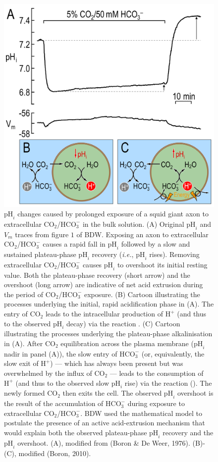 \documentclass[fleqn,10pt]{physiome}
\begin{document}
\begin{figure}
\centering
\includegraphics[scale=0.25]{Figure 1.png}
\caption{\label{fig:1} $\mathrm{pH}_i$ changes caused by prolonged exposure of a squid giant axon to extracellular $\mathrm{CO_2}$/$\mathrm{HCO_3^-}$ in the bulk solution. (A) Original $\mathrm{pH}_i$ and $V_m$ traces from figure $1$ of BDW. Exposing an axon to extracellular $\mathrm{CO_2}$/$\mathrm{HCO_3^-}$ causes a rapid fall in $\mathrm{pH}_i$ followed by a slow and sustained plateau-phase $\mathrm{pH}_i$ recovery (\emph{i.e.}, $\mathrm{pH}_i$ rises). Removing extracellular $\mathrm{CO_2}$/$\mathrm{HCO_3^-}$ causes $\mathrm{pH}_i$ to overshoot its initial resting value. Both the plateau-phase recovery (short arrow) and the overshoot (long arrow) are indicative of net acid extrusion during the period of $\mathrm{CO_2}$/$\mathrm{HCO_3^-}$ exposure. (B) Cartoon illustrating the processes underlying the initial, rapid acidification phase in (A). The entry of $\mathrm{CO_2}$ leads to the intracellular production of $\mathrm{H^+}$ (and thus to the observed $\mathrm{pH}_i$ decay) via the reaction . (C) Cartoon illustrating the processes underlying the plateau-phase alkalinisation in (A). After $\mathrm{CO_2}$ equilibration across the plasma membrane ($\mathrm{pH}_i$ nadir in panel (A)), the slow entry of $\mathrm{HCO_3^-}$ (or, equivalently, the slow exit of $\mathrm{H^+}$) --- which has always been present but was overwhelmed by the influx of $\mathrm{CO_2}$ --- leads to the consumption of $\mathrm{H^+}$ (and thus to the observed slow $\mathrm{pH}_i$ rise) via the reaction (). The newly formed $\mathrm{CO_2}$ then exits the cell. The observed $\mathrm{pH}_i$ overshoot is the result of the accumulation of $\mathrm{HCO_3^-}$ during exposure to extracellular $\mathrm{CO_2}$/$\mathrm{HCO_3^-}$. BDW used the mathematical model to postulate the presence of an active acid-extrusion mechanism that would explain both the observed plateau-phase $\mathrm{pH}_i$ recovery and the $\mathrm{pH}_i$ overshoot. (A), modified from (Boron \& De Weer, 1976). (B)-(C), modified (Boron, 2010).}

\end{figure}
\end{document}
